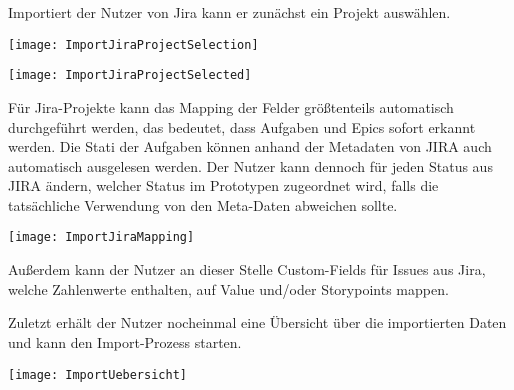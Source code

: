 Importiert der Nutzer von Jira kann er zunächst ein Projekt auswählen.

\vspace{20pt}
\begin{center}
    \begin{minipage}{1\linewidth}
        \texttt{[image: ImportJiraProjectSelection]}
    \end{minipage}
\end{center}
\vspace{20pt}

\vspace{20pt}
\begin{center}
    \begin{minipage}{1\linewidth}
        \texttt{[image: ImportJiraProjectSelected]}
    \end{minipage}
\end{center}
\vspace{20pt}

Für Jira-Projekte kann das Mapping der Felder größtenteils automatisch durchgeführt werden, das bedeutet, dass Aufgaben und Epics sofort erkannt werden. Die Stati der Aufgaben können anhand der Metadaten von JIRA auch automatisch ausgelesen werden. Der Nutzer kann dennoch für jeden Status aus JIRA ändern, welcher Status im Prototypen zugeordnet wird, falls die tatsächliche Verwendung von den Meta-Daten abweichen sollte.

\vspace{20pt}
\begin{center}
    \begin{minipage}{1\linewidth}
        \texttt{[image: ImportJiraMapping]}
    \end{minipage}
\end{center}
\vspace{20pt}

Außerdem kann der Nutzer an dieser Stelle Custom-Fields für Issues aus Jira, welche Zahlenwerte enthalten, auf Value und/oder Storypoints mappen.

Zuletzt erhält der Nutzer nocheinmal eine Übersicht über die importierten Daten und kann den Import-Prozess starten.

\vspace{20pt}
\begin{center}
    \begin{minipage}{1\linewidth}
        \texttt{[image: ImportUebersicht]}
    \end{minipage}
\end{center}
\vspace{20pt}

